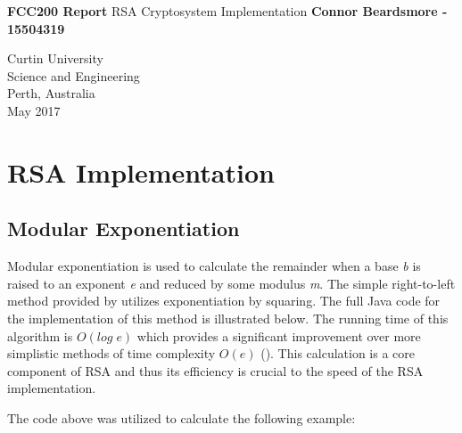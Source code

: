 \documentclass[]{article}
\begin{document}



\begin{titlepage}
	\begin{center}
		\vspace*{1cm}
		\LARGE\textbf{FCC200 Report}
		\break
		RSA Cryptosystem Implementation
		\vspace{1cm}
		\break
		\Large\textbf{Connor Beardsmore - 15504319} 
		\vspace{15cm}

		\normalsize
		Curtin University \\
		Science and Engineering \\
		Perth, Australia \\
	    May 2017
	    
	\end{center}
\end{titlepage}

\vspace*{-0.8cm}
\section*{\hfil RSA Implementation\hfil}

\subsection*{Modular Exponentiation}
\noindent
Modular exponentiation is used to calculate the remainder when a base \textit{b} is raised to an exponent \textit{e} and reduced by some modulus \textit{m}. The simple right-to-left method provided by \cite{alttext} utilizes exponentiation by squaring. The full Java code for the implementation of this method is illustrated below. The running time of this algorithm is $O(log\;e)$ which provides a significant improvement over more simplistic methods of time complexity $O(e)$ (\cite{maintext}). This calculation is a core component of RSA and thus its efficiency is crucial to the speed of the RSA implementation.

\vspace{0.2cm}
{}

\noindent
The code above was utilized to calculate the following example:
\end{document}
